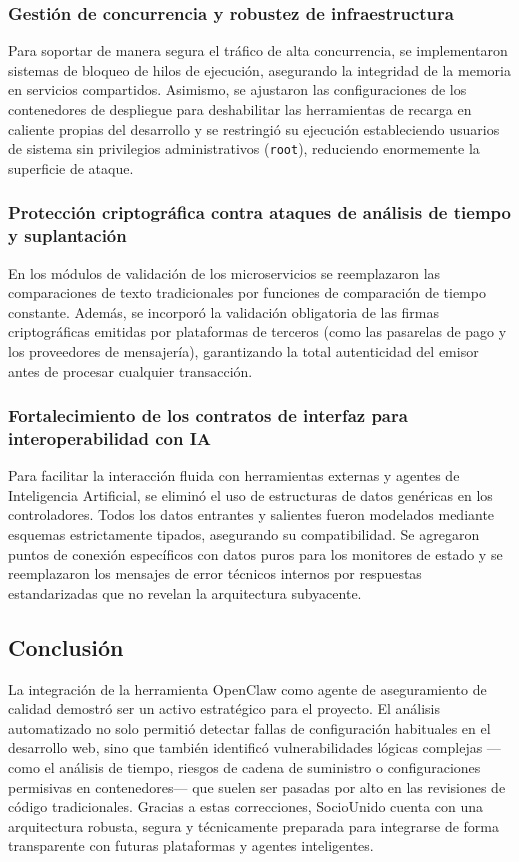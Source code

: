 \subsubsection{Gestión de concurrencia y robustez de infraestructura}

Para soportar de manera segura el tráfico de alta concurrencia, se implementaron sistemas de bloqueo de hilos de ejecución, asegurando la integridad de la memoria en servicios compartidos. Asimismo, se ajustaron las configuraciones de los contenedores de despliegue para deshabilitar las herramientas de recarga en caliente propias del desarrollo y se restringió su ejecución estableciendo usuarios de sistema sin privilegios administrativos (\texttt{root}), reduciendo enormemente la superficie de ataque.

\subsubsection{Protección criptográfica contra ataques de análisis de tiempo y suplantación}

En los módulos de validación de los microservicios se reemplazaron las comparaciones de texto tradicionales por funciones de comparación de tiempo constante. Además, se incorporó la validación obligatoria de las firmas criptográficas emitidas por plataformas de terceros (como las pasarelas de pago y los proveedores de mensajería), garantizando la total autenticidad del emisor antes de procesar cualquier transacción.

\newpage

\subsubsection{Fortalecimiento de los contratos de interfaz para interoperabilidad con IA}

Para facilitar la interacción fluida con herramientas externas y agentes de Inteligencia Artificial, se eliminó el uso de estructuras de datos genéricas en los controladores. Todos los datos entrantes y salientes fueron modelados mediante esquemas estrictamente tipados, asegurando su compatibilidad. Se agregaron puntos de conexión específicos con datos puros para los monitores de estado y se reemplazaron los mensajes de error técnicos internos por respuestas estandarizadas que no revelan la arquitectura subyacente.

\subsection{Conclusión}

La integración de la herramienta OpenClaw como agente de aseguramiento de calidad demostró ser un activo estratégico para el proyecto. El análisis automatizado no solo permitió detectar fallas de configuración habituales en el desarrollo web, sino que también identificó vulnerabilidades lógicas complejas —como el análisis de tiempo, riesgos de cadena de suministro o configuraciones permisivas en contenedores— que suelen ser pasadas por alto en las revisiones de código tradicionales. Gracias a estas correcciones, SocioUnido cuenta con una arquitectura robusta, segura y técnicamente preparada para integrarse de forma transparente con futuras plataformas y agentes inteligentes.
